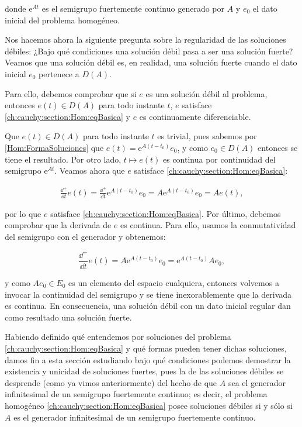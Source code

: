 donde $\mathrm{e}^{At}$ es el semigrupo fuertemente continuo generado por $A$ y $e_0$ el dato inicial del problema homogéneo. 

Nos hacemos ahora la siguiente pregunta sobre la regularidad de las soluciones débiles: ¿Bajo qué condiciones una solución débil pasa a ser una solución fuerte? Veamos que una solución débil es, en realidad, una solución fuerte cuando el dato inicial $e_0$ pertenece a $D(A)$.

Para ello, debemos comprobar que si $e$ es una solución débil al problema, entonces $e(t) \in D(A)$ para todo instante $t$, $e$ satisface \eqref{ch:cauchy:section:Hom:eqBasica} y $e$ es continuamente diferenciable.

Que $e(t) \in D(A)$ para todo instante $t$ es trivial, pues sabemos por \eqref{Hom:FormaSoluciones} que $e(t) = \mathrm{e}^{A(t-t_0)}e_0$, y como $e_0 \in D(A)$ entonces se tiene el resultado. Por otro lado, $t \mapsto e(t)$ es continua por continuidad del semigrupo $\mathrm{e}^{At}$. Veamos ahora que $e$ satisface \eqref{ch:cauchy:section:Hom:eqBasica}:

\begin{align*}
    \frac{\dd^+}{\dd t}e(t) = \frac{\dd^+}{\dd t}\mathrm{e}^{A(t-t_0)}e_0 = A\mathrm{e}^{A(t-t_0)}e_0 = Ae(t),
\end{align*}

por lo que $e$ satisface \eqref{ch:cauchy:section:Hom:eqBasica}. Por último, debemos comprobar que la derivada de $e$ es continua. Para ello, usamos la conmutatividad del semigrupo con el generador y obtenemos:

\[\frac{\dd^+}{\dd t}e(t) = A\mathrm{e}^{A(t-t_0)}e_0 = \mathrm{e}^{A(t-t_0)}Ae_0,\]

y como $Ae_0 \in E_0$ es un elemento del espacio cualquiera, entonces volvemos a invocar la continuidad del semigrupo y se tiene inexorablemente que la derivada es continua. En consecuencia, una solución débil con un dato inicial regular dan como resultado una solución fuerte.

Habiendo definido qué entendemos por soluciones del problema \eqref{ch:cauchy:section:Hom:eqBasica} y qué formas pueden tener dichas soluciones, damos fin a esta sección estudiando bajo qué condiciones podemos demostrar la existencia y unicidad de soluciones fuertes, pues la de las soluciones débiles se desprende (como ya vimos anteriormente) del hecho de que $A$ sea el generador infinitesimal de un semigrupo fuertemente continuo; es decir, el problema homogéneo \eqref{ch:cauchy:section:Hom:eqBasica} posee soluciones débiles si y sólo si $A$ es el generador infinitesimal de un semigrupo fuertemente continuo.

